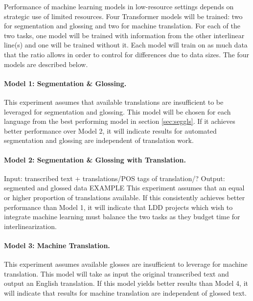 Performance of machine learning models in low-resource settings depends on strategic use of limited resources. Four Transformer models will be trained: two for segmentation and glossing and two for machine translation. For each of the two tasks, one model will be trained with information from the other interlinear line(s) and one will be trained without it. Each model will train on as much data that the ratio allows in order to control for differences due to data sizes. The four models are described below. 

\paragraph{Model 1: Segmentation \& Glossing.} 
This experiment assumes that available translations are insufficient to be leveraged for segmentation and glossing. This model will be chosen for each language from the best performing model in section \ref{sec:seggls}. 
If it achieves better performance over Model 2, it will indicate results for automated segmentation and glossing are independent of translation work.

\paragraph{Model 2: Segmentation \& Glossing with Translation.}
Input: transcribed text + translations/POS tags of translation/?
Output: segmented and glossed data
EXAMPLE
This experiment assumes that an equal or higher proportion of translations available. If this consistently achieves better performance than Model 1, it will indicate that LDD projects which wish to integrate machine learning must balance the two tasks as they budget time for interlinearization.

\paragraph{Model 3: Machine Translation.} 
This experiment assumes available glosses are insufficient to leverage for machine translation. This model will take as input the original transcribed text and output an English translation. If this model yields better results than Model 4, it will indicate that results for machine translation are independent of glossed text.

